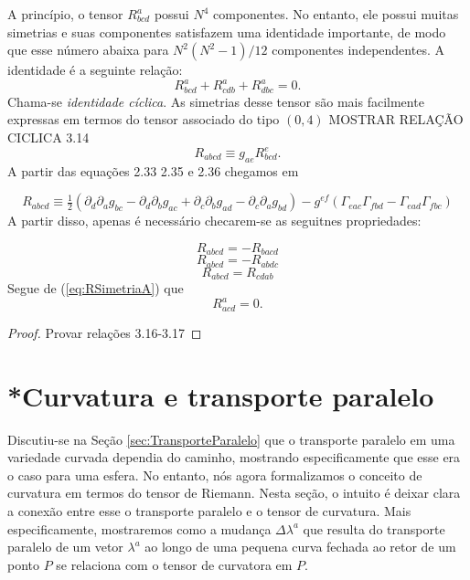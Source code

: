  A princípio, o tensor $R^a_{bcd}$ possui $N^4$ componentes. No entanto, ele possui muitas simetrias e suas componentes satisfazem uma identidade importante, de modo que esse número abaixa para $N^2(N^2-1)/12$ componentes independentes. A identidade é a seguinte relação:
 \begin{equation}\label{eq:IdentidadeCiclicaTensorDeCurvatura}
	 R^a_{bcd}+R^a_{cdb}+R^a_{dbc}=0.
 \end{equation}
 Chama-se \textit{identidade cíclica}. As simetrias desse tensor são mais facilmente expressas em termos do tensor associado do tipo $(0,4)$
 {\color{red} MOSTRAR RELAÇÃO CICLICA 3.14}
\[
	R_{abcd} \equiv g_{ae}R^e_{bcd}.
\]
{\color{red}
A partir das equações 2.33 2.35 e 2.36 chegamos em
}

\begin{equation}
	R_{a b c d} \equiv \tfrac{1}{2}\left(\partial_{d} \partial_{a} g_{b c}-\partial_{d} \partial_{b} g_{a c}+\partial_{c} \partial_{b} g_{a d}-\partial_{c} \partial_{a} g_{b d}\right)-g^{e f}\left(\Gamma_{e a c} \Gamma_{f b d}-\Gamma_{e a d} \Gamma_{f b c}\right)
\end{equation}
A partir disso, apenas é necessário checarem-se as seguitnes propriedades:

\begin{equation}\label{eq:RSimetriaA}
	R_{abcd}=-R_{bacd}
\end{equation}
\begin{equation}\label{eq:RSimetriaB}
	R_{abcd}=-R_{abdc}
\end{equation}
\begin{equation}\label{eq:RSimetriaC}
	R_{abcd}=R_{cdab}
\end{equation}
Segue de (\ref{eq:RSimetriaA}) que
\[
R^a_{acd} = 0.
\]


\begin{proof}
	Provar relações 3.16-3.17
\end{proof}








\section{*Curvatura e transporte paralelo}\label{sec:CurvaturaTransporteParalelo}

Discutiu-se na Seção \ref{sec:TransporteParalelo} que o transporte paralelo em uma variedade curvada dependia do caminho, mostrando especificamente que esse era o caso para uma esfera. No entanto, nós agora formalizamos o conceito de curvatura em termos do tensor de Riemann. Nesta seção, o intuito é deixar clara a conexão entre esse o transporte paralelo e o tensor de curvatura. Mais especificamente, mostraremos como a mudança $\Delta\lambda^a$ que resulta do transporte paralelo de um vetor $\lambda^a$ ao longo de uma pequena curva fechada ao retor de um ponto $P$ se relaciona com o tensor de curvatora em $P$.


